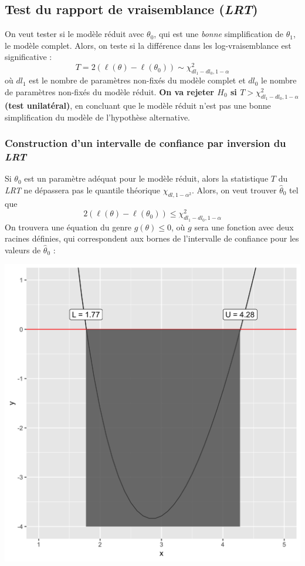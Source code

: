 \documentclass[french, landscape]{article}
\begin{document}
\begin{multicols*}{3}
\subsection*{Test du rapport de vraisemblance (\emph{LRT})}
On veut tester si le modèle réduit avec $\theta_0$, qui est une \emph{bonne} simplification de $\theta_1$, le modèle complet. Alors, on teste si la différence dans les log-vraisemblance est significative : 
\[T = 2 \left( \ell(\theta) - \ell(\theta_0) \right) \sim  \chi_{dl_1 - dl_0, 1-\alpha}^2\]
où $dl_1$ est le nombre de paramètres non-fixés du modèle complet et $dl_0$ le nombre de paramètres non-fixés du modèle réduit. \textbf{On va rejeter $H_0$ si $T >\chi_{dl_1 - dl_0, 1-\alpha}^2 $ (test unilatéral)}, en concluant que le modèle réduit n'est pas une bonne simplification du modèle de l'hypothèse alternative.

\subsubsection*{Construction d'un intervalle de confiance par inversion du \emph{LRT}}
Si $\theta_0$ est un paramètre adéquat pour le modèle réduit, alors la statistique $T$ du \emph{LRT} ne dépassera pas le quantile théorique $\chi_{dl, 1- \alpha^2}$. Alors, on veut trouver $\hat{\theta}_0$ tel que
\[2 \left( \ell(\theta) - \ell(\theta_0) \right) \leq  \chi_{dl_1 - dl_0, 1-\alpha}^2\]
On trouvera une équation du genre $g(\theta) \leq 0$, où $g$ sera une fonction avec deux racines définies, qui correspondent aux bornes de l'intervalle de confiance pour les valeurs de $\hat{\theta}_0$ : 
\begin{center}
\includegraphics[scale=0.07]{src/Q13-57_visualisation.png}
\end{center}


\end{multicols*}
\end{document}
